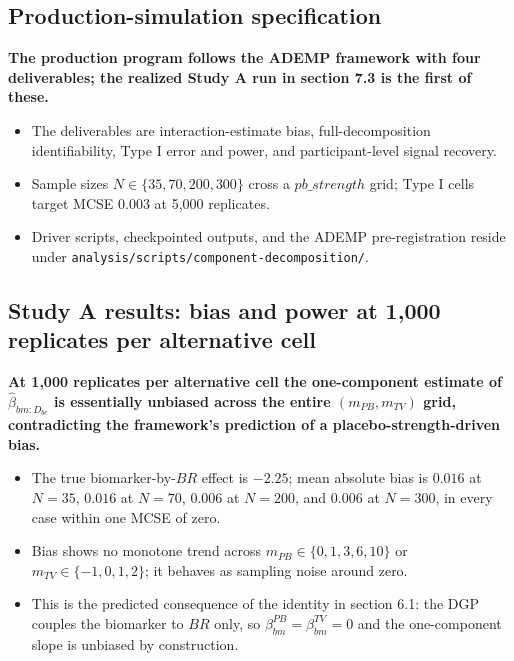 \documentclass[
  11pt,
]{article}
\begin{document}
\subsection{Production-simulation specification}\label{production-simulation-specification}

\textbf{The production program follows the ADEMP framework with four deliverables; the realized Study A run in section 7.3 is the first of these.}

\begin{itemize}\setlength{\itemsep}{2pt}\setlength{\parskip}{0pt}
\item The deliverables are interaction-estimate bias, full-decomposition identifiability, Type I error and power, and participant-level signal recovery.
\item Sample sizes $N \in \{35,70,200,300\}$ cross a $pb\_strength$ grid; Type I cells target MCSE $0.003$ at 5{,}000 replicates.
\item Driver scripts, checkpointed outputs, and the ADEMP pre-registration reside under \texttt{analysis/scripts/component-decomposition/}.
\end{itemize}

\subsection{Study A results: bias and power at 1,000 replicates per alternative cell}\label{study-a-results-bias-and-power-at-1000-replicates-per-alternative-cell}

\textbf{At 1,000 replicates per alternative cell the one-component estimate of $\hat\beta_{bm:D_{bc}}$ is essentially unbiased across the entire $(m_{PB}, m_{TV})$ grid, contradicting the framework's prediction of a placebo-strength-driven bias.}

\begin{itemize}\setlength{\itemsep}{2pt}\setlength{\parskip}{0pt}
\item The true biomarker-by-$BR$ effect is $-2.25$; mean absolute bias is $0.016$ at $N=35$, $0.016$ at $N=70$, $0.006$ at $N=200$, and $0.006$ at $N=300$, in every case within one MCSE of zero.
\item Bias shows no monotone trend across $m_{PB} \in \{0,1,3,6,10\}$ or $m_{TV} \in \{-1,0,1,2\}$; it behaves as sampling noise around zero.
\item This is the predicted consequence of the identity in section 6.1: the DGP couples the biomarker to $BR$ only, so $\beta_{bm}^{PB} = \beta_{bm}^{TV} = 0$ and the one-component slope is unbiased by construction.
\end{itemize}
\end{document}
